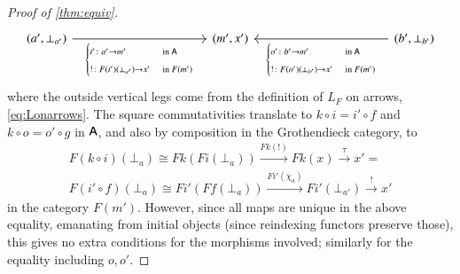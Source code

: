 \documentclass[reqno]{amsart}
\begin{document}
\begin{proof}[Proof of \cref{thm:equiv}]
\begin{displaymath}
\begin{tikzcd}[sep=1.5in,ampersand replacement=\&]
 (a',\bot_{a'})\ar[r,"{\begin{cases}i'\maps a'\to m' &\textrm{in }\A \\!\maps F(i')(\bot_{a'})\to x' &\textrm{in }F(m')\end{cases}}"'] \& (m',x') \& (b',\bot_{b'})\ar[l,"{\begin{cases}o'\maps b'\to m' &\textrm{in }\A \\!\maps F(o')(\bot_{b'})\to x' &\textrm{in }F(m')\end{cases}}"]
 \end{tikzcd}
\end{displaymath}
where the outside vertical legs come from the definition of $L_F$ on arrows, \cref{eq:Lonarrows}. 
The square commutativities translate to $k\circ i=i'\circ f$ and $k\circ o=o'\circ g$ in $\mathsf{A}$, and also by composition in the Grothendieck category, to
\begin{gather}\label{eq:Grothcommutativity}
 F(k\circ i)(\bot_a)\cong Fk(Fi(\bot_a))\xrightarrow{Fk(!)}Fk(x)\xrightarrow{\tau}x'= \\
 F(i'\circ f)(\bot_a)\cong Fi'(Ff(\bot_a))\xrightarrow{Fi'(\chi_a)}Fi'(\bot_{a'})\xrightarrow{!}x'\nonumber
\end{gather}
in the category $F(m')$. However, since all maps are unique in the above equality, emanating from initial objects (since reindexing functors preserve those), this gives no extra conditions for the morphisms involved; similarly for the equality including $o, o'$.


\end{proof}
\end{document}
